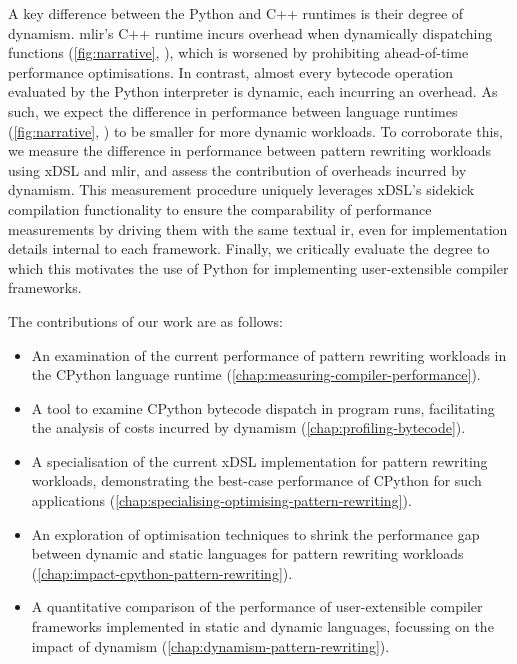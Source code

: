 

A key difference between the Python and C++ runtimes is their degree of dynamism.
\ac{mlir}'s C++ runtime incurs overhead when dynamically dispatching functions (\autoref{fig:narrative}, ), which is worsened by prohibiting ahead-of-time performance optimisations. In contrast, almost every bytecode operation evaluated by the Python interpreter is dynamic, each incurring an overhead.
As such, we expect the difference in performance between language runtimes (\autoref{fig:narrative}, ) to be smaller for more dynamic workloads.
To corroborate this, we measure the difference in performance between pattern rewriting workloads using xDSL and \ac{mlir}, and assess the contribution of overheads incurred by dynamism.
This measurement procedure uniquely leverages xDSL's sidekick compilation functionality to ensure the comparability of performance measurements by driving them with the same textual \ac{ir}, even for implementation details internal to each framework.
Finally, we critically evaluate the degree to which this motivates the use of Python for implementing user-extensible compiler frameworks.



The contributions of our work are as follows:

\begin{itemize}
    \item An examination of the current %
    performance of pattern rewriting workloads in the CPython language runtime (\autoref{chap:measuring-compiler-performance}).%
    \item A tool to examine CPython bytecode dispatch in program runs, facilitating the analysis of costs incurred by dynamism (\autoref{chap:profiling-bytecode}).
    \item A specialisation of the current xDSL implementation for pattern rewriting workloads, demonstrating the best-case performance of CPython for such applications (\autoref{chap:specialising-optimising-pattern-rewriting}).
    \item An exploration of optimisation techniques to shrink the performance gap between dynamic and static languages for pattern rewriting workloads (\autoref{chap:impact-cpython-pattern-rewriting}).
    \item A quantitative comparison of the performance of user-extensible compiler frameworks implemented in static and dynamic languages, focussing on the impact of dynamism (\autoref{chap:dynamism-pattern-rewriting}). %
\end{itemize}
